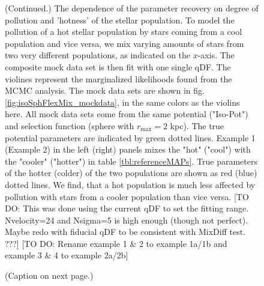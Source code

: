 \addtocounter{figure}{-1}
\begin{figure} [t!]
  \caption{(Continued.) The dependence of the parameter recovery on degree of pollution and 'hotness' of the stellar population. To model the pollution of a hot stellar population by stars coming from a cool population and vice versa, we mix varying amounts of stars from two very different populations, as indicated on the $x$-axis. The composite mock data set is then fit with one single qDF. The violines represent the marginalized likelihoods found from the MCMC analysis. The mock data sets are shown in fig. \ref{fig:isoSphFlexMix_mockdata}, in the same colors as the violins here. All mock data sets come from the same potential ("Iso-Pot") and selection function (sphere with $r_\text{max} = 2$ kpc). The true potential parameters are indicated by green dotted lines. Example 1 (Example 2) in the left (right) panels mixes the "hot" ("cool") \MAP with the "cooler" ("hotter") \MAP in table \ref{tbl:referenceMAPs}. True parameters of the hotter (colder) of the two populations are shown as red (blue) dotted lines. We find, that a hot population is much less affected by pollution with stars from a cooler population than vice versa.  [TO DO: This was done using the current qDF to set the fitting range. Nvelocity=24 and Nsigma=5 is high enough (though not perfect). Maybe redo with fiducial qDF to be consistent with MixDiff test. ???] [TO DO: Rename example 1 \& 2 to example 1a/1b and example 3 \& 4 to example 2a/2b]}
\end{figure}


\begin{figure}
\caption{(Caption on next page.)}
\label{fig:isoSphFlexMixDiff}
\end{figure}


